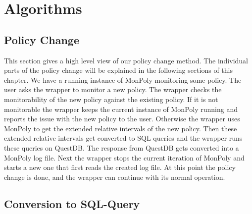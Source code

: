 \chapter{Algorithms}

\section{Policy Change}
This section gives a high level view of our policy change method.
The individual parts of the policy change will be explained in the following sections of this chapter.
We have a running instance of MonPoly monitoring some policy.
The user asks the wrapper to monitor a new policy.
The wrapper checks the monitorability of the new policy against the existing policy.
If it is not monitorable the wrapper keeps the current instance of MonPoly running and reports the issue with the new policy to the user.
Otherwise the wrapper uses MonPoly to get the extended relative intervals of the new policy.
Then these extended relative intervals get converted to SQL queries and the wrapper runs these queries on QuestDB.
The response from QuestDB gets converted into a MonPoly log file.
Next the wrapper stops the current iteration of MonPoly and starts a new one that first reads the created log file.
At this point the policy change is done, and the wrapper can continue with its normal operation.







\section{Conversion to SQL-Query}



